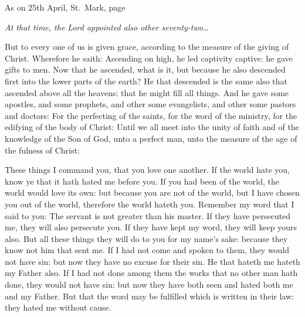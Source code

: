 
As on 25th April, St.~Mark, page \pageref{Go.stmark}

\emph{At that time, the Lord appointed also other seventy-two\ldots}

\bigskip




But to every one of us is given grace, according to the measure of
the giving of Christ.
Wherefore he saith: Ascending on high, he led captivity captive: he
gave gifts to men.
Now that he ascended, what is it, but because he also descended
first into the lower parts of the earth?
He that descended is the same also that ascended above all the
heavens: that he might fill all things.
And he gave some apostles, and some prophets, and other some
evangelists, and other some pastors and doctors:
For the perfecting of the saints, for the word of the ministry,
for the edifying of the body of Christ:
Until we all meet into the unity of faith and of the knowledge of
the Son of God, unto a perfect man, unto the measure of the age of the
fulness of Christ:

\bigskip


These things I command you, that you love one another.
If the world hate you, know ye that it hath hated me before you.
If you had been of the world, the world would love its own: but
because you are not of the world, but I have chosen you out of the
world, therefore the world hateth you.
Remember my word that I said to you: The servant is not greater
than his master. If they have persecuted me, they will also persecute
you. If they have kept my word, they will keep yours also.
But all these things they will do to you for my name's sake:
because they know not him that sent me.
If I had not come and spoken to them, they would not have sin:
but now they have no excuse for their sin.
He that hateth me hateth my Father also.
If I had not done among them the works that no other man hath
done, they would not have sin: but now they have both seen and hated
both me and my Father.
But that the word may be fulfilled which is written in their law:
they hated me without cause.


